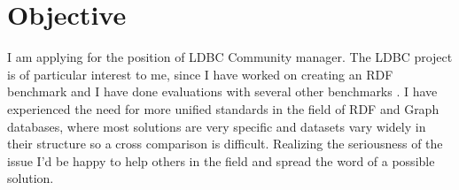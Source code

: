 \documentclass[11pt]{article}
\begin{document}
\section*{Objective}
I am applying for the position of LDBC Community manager. The LDBC project is
of particular interest to me, since I have worked on creating an RDF
benchmark \cite{bowlognaBench} and I have done evaluations with several other
benchmarks \cite{nosqlrdf}. I have experienced the need for more unified
standards in the field of RDF and Graph databases, where most solutions are
very specific and datasets vary widely in their structure so a
cross comparison is difficult. Realizing the seriousness of the issue
I'd be happy to help others in the field and spread the word of a
possible solution.

\end{document}

